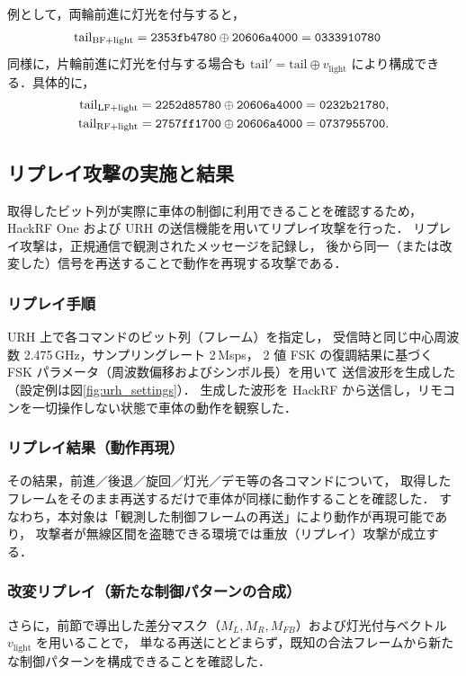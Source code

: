 \documentclass[twocolumn,10pt,a4paper]{jsarticle}
\begin{document}
例として，両輪前進に灯光を付与すると，
{\small
\begin{align}
\mathrm{tail}_{\mathrm{BF+light}}
&=\texttt{2353fb4780}\oplus\texttt{20606a4000}
=\texttt{0333910780}\notag
\end{align}
}%
同様に，片輪前進に灯光を付与する場合も
$\mathrm{tail}'=\mathrm{tail}\oplus v_{\mathrm{light}}$ により構成できる．具体的に，
{\small
\begin{align}
\mathrm{tail}_{\mathrm{LF+light}}
&=\texttt{2252d85780}\oplus\texttt{20606a4000}
=\texttt{0232b21780},\notag\\
\mathrm{tail}_{\mathrm{RF+light}}
&=\texttt{2757ff1700}\oplus\texttt{20606a4000}
=\texttt{0737955700}.\notag
\end{align}
}


\subsection{リプレイ攻撃の実施と結果}
\label{sec:replay_result}

取得したビット列が実際に車体の制御に利用できることを確認するため，
HackRF One および URH の送信機能を用いてリプレイ攻撃を行った．
リプレイ攻撃は，正規通信で観測されたメッセージを記録し，
後から同一（または改変した）信号を再送することで動作を再現する攻撃である\cite{rfc3552}．

\subsubsection{リプレイ手順}
URH 上で各コマンドのビット列（フレーム）を指定し，
受信時と同じ中心周波数 2.475\,GHz，サンプリングレート 2\,Msps，
2 値 FSK の復調結果に基づく FSK パラメータ（周波数偏移およびシンボル長）を用いて
送信波形を生成した（設定例は図\ref{fig:urh_settings}）．
生成した波形を HackRF から送信し，リモコンを一切操作しない状態で車体の動作を観察した．

\subsubsection{リプレイ結果（動作再現）}
その結果，前進／後退／旋回／灯光／デモ等の各コマンドについて，
取得したフレームをそのまま再送するだけで車体が同様に動作することを確認した．
すなわち，本対象は「観測した制御フレームの再送」により動作が再現可能であり，
攻撃者が無線区間を盗聴できる環境では重放（リプレイ）攻撃が成立する．

\subsubsection{改変リプレイ（新たな制御パターンの合成）}
さらに，前節で導出した差分マスク（$M_L, M_R, M_{FB}$）および灯光付与ベクトル $v_{\mathrm{light}}$ を用いることで，
単なる再送にとどまらず，既知の合法フレームから新たな制御パターンを構成できることを確認した．
\end{document}
